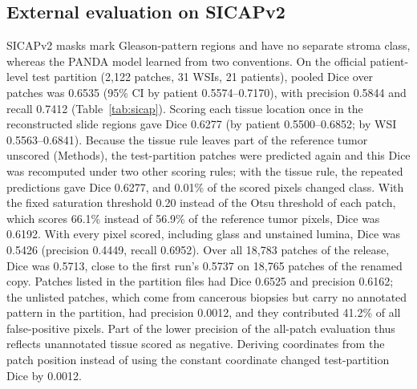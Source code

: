 \documentclass[10pt,letterpaper]{article}
\begin{document}
\subsection*{External evaluation on SICAPv2}
SICAPv2 masks mark Gleason-pattern regions and have no separate stroma class, whereas the PANDA model learned from two conventions. On the official patient-level test partition (2,122 patches, 31 WSIs, 21 patients), pooled Dice over patches was 0.6535 (95\% CI by patient 0.5574--0.7170), with precision 0.5844 and recall 0.7412 (Table~\ref{tab:sicap}). Scoring each tissue location once in the reconstructed slide regions gave Dice 0.6277 (by patient 0.5500--0.6852; by WSI 0.5563--0.6841). Because the tissue rule leaves part of the reference tumor unscored (Methods), the test-partition patches were predicted again and this Dice was recomputed under two other scoring rules; with the tissue rule, the repeated predictions gave Dice 0.6277, and 0.01\% of the scored pixels changed class. With the fixed saturation threshold 0.20 instead of the Otsu threshold of each patch, which scores 66.1\% instead of 56.9\% of the reference tumor pixels, Dice was 0.6192. With every pixel scored, including glass and unstained lumina, Dice was 0.5426 (precision 0.4449, recall 0.6952). Over all 18,783 patches of the release, Dice was 0.5713, close to the first run's 0.5737 on 18,765 patches of the renamed copy. Patches listed in the partition files had Dice 0.6525 and precision 0.6162; the unlisted patches, which come from cancerous biopsies but carry no annotated pattern in the partition, had precision 0.0012, and they contributed 41.2\% of all false-positive pixels. Part of the lower precision of the all-patch evaluation thus reflects unannotated tissue scored as negative. Deriving coordinates from the patch position instead of using the constant coordinate changed test-partition Dice by 0.0012.
\end{document}
